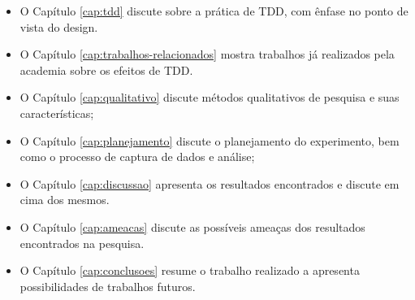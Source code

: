 \begin{itemize}
	\item O Capítulo \ref{cap:tdd} discute sobre a prática de TDD, com ênfase no
	ponto de vista do design.
  
	\item O Capítulo \ref{cap:trabalhos-relacionados} mostra trabalhos já
	realizados pela academia sobre os efeitos de TDD.

 	\item O Capítulo \ref{cap:qualitativo} discute métodos qualitativos de
 	pesquisa e suas características;

	\item O Capítulo \ref{cap:planejamento} discute o planejamento do experimento,
	bem como o processo de captura de dados e análise;

	\item O Capítulo \ref{cap:discussao} apresenta os resultados encontrados e
	discute em cima dos mesmos.
	
	\item O Capítulo \ref{cap:ameacas} discute as possíveis ameaças dos resultados
	encontrados na pesquisa.
	
	\item O Capítulo \ref{cap:conclusoes} resume o trabalho realizado a apresenta
	possibilidades de trabalhos futuros.
\end{itemize}

